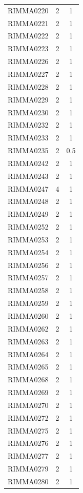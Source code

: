 \documentclass[12pt]{article}
\begin{document}
\begin{table}[htbp]
\begin{tabular}{ccc}
    RIMMA0220 & 2     & 1 \\
    RIMMA0221 & 2     & 1 \\
    RIMMA0222 & 2     & 1 \\
    RIMMA0223 & 2     & 1 \\
    RIMMA0226 & 2     & 1 \\
    RIMMA0227 & 2     & 1 \\
    RIMMA0228 & 2     & 1 \\
    RIMMA0229 & 2     & 1 \\
    RIMMA0230 & 2     & 1 \\
    RIMMA0232 & 2     & 1 \\
    RIMMA0233 & 2     & 1 \\
    RIMMA0235 & 2     & 0.5 \\
    RIMMA0242 & 2     & 1 \\
    RIMMA0243 & 2     & 1 \\
    RIMMA0247 & 4     & 1 \\
    RIMMA0248 & 2     & 1 \\
    RIMMA0249 & 2     & 1 \\
    RIMMA0252 & 2     & 1 \\
    RIMMA0253 & 2     & 1 \\
    RIMMA0254 & 2     & 1 \\
    RIMMA0256 & 2     & 1 \\
    RIMMA0257 & 2     & 1 \\
    RIMMA0258 & 2     & 1 \\
    RIMMA0259 & 2     & 1 \\
    RIMMA0260 & 2     & 1 \\
    RIMMA0262 & 2     & 1 \\
    RIMMA0263 & 2     & 1 \\
    RIMMA0264 & 2     & 1 \\
    RIMMA0265 & 2     & 1 \\
    RIMMA0268 & 2     & 1 \\
    RIMMA0269 & 2     & 1 \\
    RIMMA0270 & 2     & 1 \\
    RIMMA0272 & 2     & 1 \\
    RIMMA0275 & 2     & 1 \\
    RIMMA0276 & 2     & 1 \\
    RIMMA0277 & 2     & 1 \\
    RIMMA0279 & 2     & 1 \\
    RIMMA0280 & 2     & 1 \\

\end{tabular}
\end{table}
\end{document}
